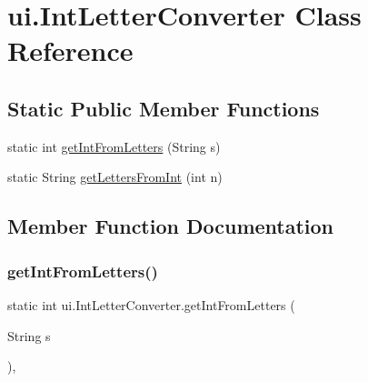 \hypertarget{classui_1_1_int_letter_converter}{}\section{ui.\+Int\+Letter\+Converter Class Reference}
\label{classui_1_1_int_letter_converter}
\subsection*{Static Public Member Functions}
\begin{DoxyCompactItemize}
\item 
static int \mbox{\hyperlink{classui_1_1_int_letter_converter_adb6e9cbdedba0aaa6960c395bdb4f236}{get\+Int\+From\+Letters}} (String s)
\item 
static String \mbox{\hyperlink{classui_1_1_int_letter_converter_a2a4cfa28ca741286cc55ce2b5bd260c8}{get\+Letters\+From\+Int}} (int n)
\end{DoxyCompactItemize}


\subsection{Member Function Documentation}
\mbox{\label{classui_1_1_int_letter_converter_adb6e9cbdedba0aaa6960c395bdb4f236}} 
\subsubsection{\texorpdfstring{get\+Int\+From\+Letters()}{getIntFromLetters()}}
{\footnotesize\ttfamily static int ui.\+Int\+Letter\+Converter.\+get\+Int\+From\+Letters (\begin{DoxyParamCaption}\item[{String}]{s }\end{DoxyParamCaption})\hspace{0.3cm}{\ttfamily [inline]}, {\ttfamily [static]}}


